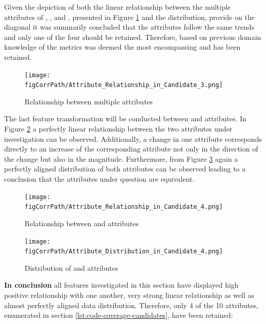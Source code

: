 \begin{enumerate}
Given the depiction of both the linear relationship between the multiple  attributes of \overallCoverage{}, \overallLineCoverage{},\coverage{} and \lineCoverage{}, presented in Figure \ref{fig:candidate3-pairplot} and the distribution, provide on the diagonal it was summarily concluded that the attributes follow the same trends and only one of the four should be retained. Therefore, based on previous domain knowledge of the metrics \overallCoverage{} was deemed the most encompassing and has been retained.

\begin{figure}[!h]
    \centering
    \texttt{[image: \\figCorrPath/Attribute\_Relationship\_in\_Candidate\_3.png]}
    \caption{Relationship between multiple attributes}
    \label{fig:candidate3-pairplot}
\end{figure}

\FloatBarrier

The last feature transformation will be conducted between \overallUncoveredConditions{} and \uncoveredConditions{} attributes. In Figure \ref{fig:candidate4-scatterplot} a perfectly linear relationship between the two attributes under investigation can be observed. Additionally, a change in one attribute corresponds directly to an increase of the corresponding attribute not only in the direction of the change but also in the magnitude. Furthermore, from Figure \ref{fig:candidate4-distribution} again a perfectly aligned distribution of both attributes can be observed leading to a conclusion that the attributes under question are equivalent.

\begin{figure}[!h]
    \centering
    \texttt{[image: \\figCorrPath/Attribute\_Relationship\_in\_Candidate\_4.png]}
    \caption{Relationship between \overallUncoveredConditions{} and \uncoveredConditions{} attributes}
    \label{fig:candidate4-scatterplot}
\end{figure}

\begin{figure}[!h]
    \centering
    \texttt{[image: \\figCorrPath/Attribute\_Distribution\_in\_Candidate\_4.png]}
    \caption{Distribution of \overallUncoveredConditions{} and \uncoveredConditions{} attributes}
    \label{fig:candidate4-distribution}
\end{figure}

\FloatBarrier
\textbf{In conclusion} all features investigated in this section have displayed high positive relationship with one another, very strong linear relationship as well as almost perfectly aligned data distribution. Therefore, only 4 of the 10 attributes, enumerated in section \ref{lst:code-coverage-candidates}, have been retained:


\end{enumerate}
